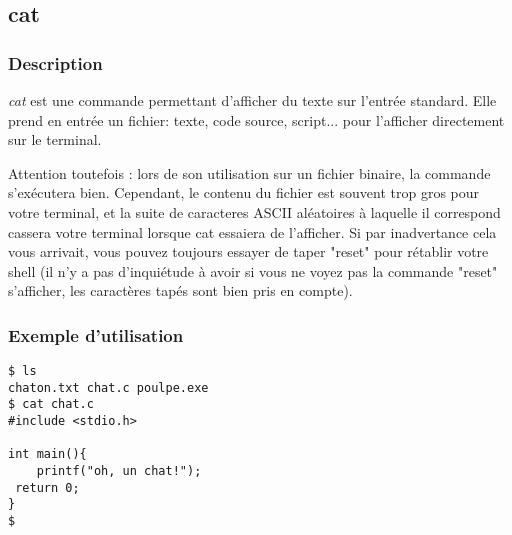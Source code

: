 \subsection{cat}
\subsubsection{Description}
\emph{cat} est une commande permettant d'afficher du texte sur l'entrée standard.
Elle prend en entrée un fichier: texte, code source, script... pour l'afficher directement sur le terminal.

Attention toutefois : lors de son utilisation sur un fichier binaire, la commande s'exécutera bien. Cependant, le contenu du fichier est souvent trop gros pour votre terminal, et la suite de caracteres ASCII aléatoires à laquelle il correspond cassera votre terminal lorsque cat essaiera de l'afficher.
Si par inadvertance cela vous arrivait, vous pouvez toujours essayer de taper "reset" pour rétablir votre shell (il n'y a pas d'inquiétude à avoir si vous ne voyez pas la commande "reset" s'afficher, les caractères tapés sont bien pris en compte).


\subsubsection{Exemple d'utilisation}

\begin{lstlisting}
$ ls
chaton.txt chat.c poulpe.exe
$ cat chat.c
#include <stdio.h>

int main(){
	printf("oh, un chat!");
 return 0;
}
$
\end{lstlisting}
